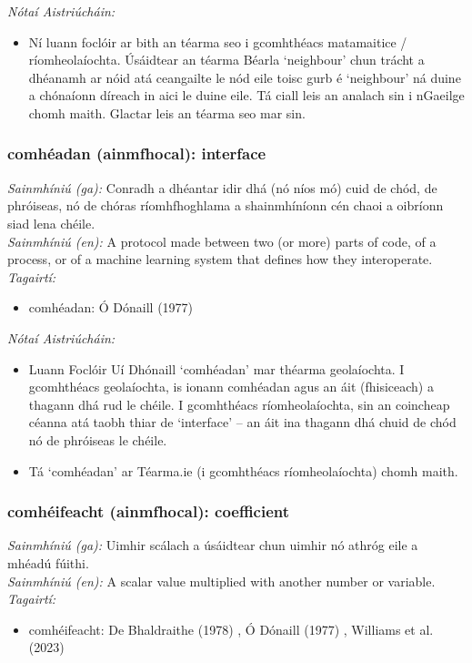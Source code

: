  \noindent \textit{Nótaí Aistriúcháin:}
\begin{itemize}
	\item Ní luann foclóir ar bith an téarma seo i gcomhthéacs matamaitice / ríomheolaíochta. Úsáidtear an téarma Béarla `neighbour' chun trácht a dhéanamh ar nóid atá ceangailte le nód eile toisc gurb é `neighbour' ná duine a chónaíonn díreach in aici le duine eile. Tá ciall leis an analach sin i nGaeilge chomh maith. Glactar leis an téarma seo mar sin.
\end{itemize}


\subsubsection*{comhéadan (ainmfhocal): interface}
 \noindent \textit{Sainmhíniú (ga):} Conradh a dhéantar idir dhá (nó níos mó) cuid de chód, de phróiseas, nó de chóras ríomhfhoghlama a shainmhíníonn cén chaoi a oibríonn siad lena chéile.
\\
 \noindent \textit{Sainmhíniú (en):} A protocol made between two (or more) parts of code, of a process, or of a machine learning system that defines how they interoperate.
\\
 \noindent \textit{Tagairtí:}
\begin{itemize}
	\item comhéadan: Ó Dónaill (1977) \cite{odonaill}
\end{itemize}

 \noindent \textit{Nótaí Aistriúcháin:}
\begin{itemize}
	\item Luann Foclóir Uí Dhónaill `comhéadan' mar théarma geolaíochta. I gcomhthéacs geolaíochta, is ionann comhéadan agus an áit (fhisiceach) a thagann dhá rud le chéile. I gcomhthéacs ríomheolaíochta, sin an coincheap céanna atá taobh thiar de `interface' -- an áit ina thagann dhá chuid de chód nó de phróiseas le chéile.
	\item Tá `comhéadan' ar Téarma.ie (i gcomhthéacs ríomheolaíochta) chomh maith.
\end{itemize}


\subsubsection*{comhéifeacht (ainmfhocal): coefficient}
 \noindent \textit{Sainmhíniú (ga):} Uimhir scálach a úsáidtear chun uimhir nó athróg eile a mhéadú fúithi.
\\
 \noindent \textit{Sainmhíniú (en):} A scalar value multiplied with another number or variable.
\\
 \noindent \textit{Tagairtí:}
\begin{itemize}
	\item comhéifeacht: De Bhaldraithe (1978) \cite{de-bhaldraithe}, Ó Dónaill (1977) \cite{odonaill}, Williams et al. (2023) \cite{storchiste}
\end{itemize}

